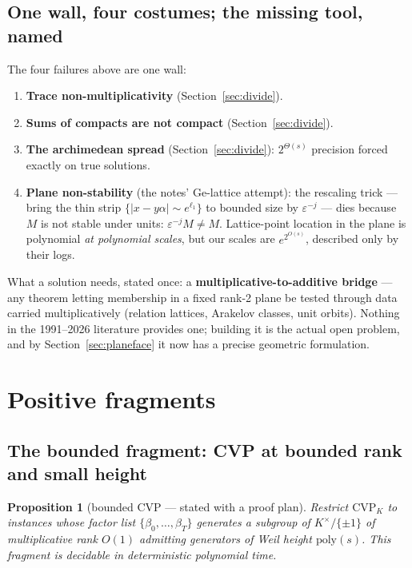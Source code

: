 \documentclass[11pt]{amsart}
\theoremstyle{plain}
\newtheorem{proposition}{Proposition}[section]
\theoremstyle{remark}
\begin{document}
\subsection{One wall, four costumes; the missing tool, named}
\label{sec:wall}

The four failures above are one wall:

\begin{enumerate}
\item \textbf{Trace non-multiplicativity}
  (Section~\ref{sec:divide}).
\item \textbf{Sums of compacts are not compact}
  (Section~\ref{sec:divide}).
\item \textbf{The archimedean spread} (Section~\ref{sec:divide}):
  $2^{\Theta(s)}$ precision forced exactly on true solutions.
\item \textbf{Plane non-stability} (the notes' Ge-lattice attempt):
  the rescaling trick --- bring the thin strip
  $\{|x - y\alpha| \sim e^{\ell_1}\}$ to bounded size by
  $\varepsilon^{-j}$ --- dies because $M$ is not stable under units:
  $\varepsilon^{-j}M \ne M$. Lattice-point location in the plane is
  polynomial \emph{at polynomial scales}, but our scales are
  $e^{2^{O(s)}}$, described only by their logs.
\end{enumerate}

What a solution needs, stated once: a
\textbf{multiplicative-to-additive bridge} --- any theorem letting
membership in a fixed rank-2 plane be tested through data carried
multiplicatively (relation lattices, Arakelov classes, unit orbits).
Nothing in the 1991--2026 literature provides one; building it is the
actual open problem, and by Section~\ref{sec:planeface} it now has a
precise geometric formulation.

\section{Positive fragments}\label{sec:fragments}

\subsection{The bounded fragment: CVP at bounded rank and small
height}\label{sec:bounded}

\begin{proposition}[bounded CVP --- stated with a proof plan]
\label{prop:bounded}
Restrict $\mathrm{CVP}_K$ to instances whose factor list
$\{\beta_0, \ldots, \beta_T\}$ generates a subgroup of
$K^\times/\{\pm1\}$ of multiplicative rank $O(1)$ admitting
generators of Weil height $\mathrm{poly}(s)$. This fragment is
decidable in deterministic polynomial time.
\end{proposition}
\end{document}
